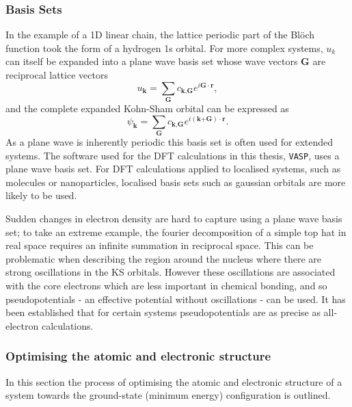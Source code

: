 \subsubsection{Basis Sets}   %

In the example of a 1D linear chain, the lattice periodic part of the Bl\"{o}ch function took the form of a hydrogen 1s orbital. For more complex systems, $u_k$ can itself be expanded into a plane wave basis set whose wave vectors $\textbf{G}$ are reciprocal lattice vectors
\begin{equation}
u_\textbf{k} = \sum_\textbf{G}c_{\textbf{k},\textbf{G}}e^{i\textbf{G}\cdot\textbf{r}},
\end{equation}
and the complete expanded Kohn-Sham orbital can be expressed as
\begin{equation} \label{KSeigenstates}
\psi_\textbf{k} = \sum_\textbf{G}c_{\textbf{k},\textbf{G}}e^{i(\textbf{k+G})\cdot\textbf{r}}.
\end{equation}
As a plane wave is inherently periodic this basis set is often used for extended systems. The software used for the DFT calculations in this thesis, \texttt{VASP}\autocite{Kresse1996}, uses a plane wave basis set. For DFT calculations applied to localised systems, such as molecules or nanoparticles, localised basis sets such as gaussian orbitals are more likely to be used.

Sudden changes in electron density are hard to capture using a plane wave basis set; to take an extreme example, the fourier decomposition of a simple top hat in real space requires an infinite summation in reciprocal space. This can be problematic when describing the region around the nucleus where there are strong oscillations in the KS orbitals. However these oscillations are associated with the core electrons which are less important in chemical bonding, and so pseudopotentials - an effective potential without oscillations - can be used. It has been established that for certain systems pseudopotentials are as precise as all-electron calculations.\autocite{Lejaeghere2016}

\subsubsection{Optimising the atomic and electronic structure}

In this section the process of optimising the atomic and electronic structure of a system towards the ground-state (minimum energy) configuration is outlined. 

